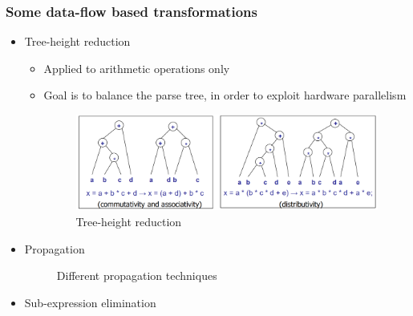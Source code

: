 \documentclass{article}
\begin{document}
\subsubsection{Some data-flow based transformations}
\begin{itemize}
    \item Tree-height reduction
        \begin{itemize}
            \item Applied to arithmetic operations only
            \item Goal is to balance the parse tree, in order to exploit hardware parallelism
            \begin{figure}[htp]
                \centering
                \includegraphics[width=17cm, scale=1]{S2/treeHeightReduction.PNG}
                \caption{Tree-height reduction}
            \end{figure}
        \end{itemize}
    \newpage
    \item Propagation
        \begin{figure}[htp]%
            \centering
            \qquad
            \caption{Different propagation techniques}%
        \end{figure}
    \item Sub-expression elimination

\end{itemize}
\end{document}
